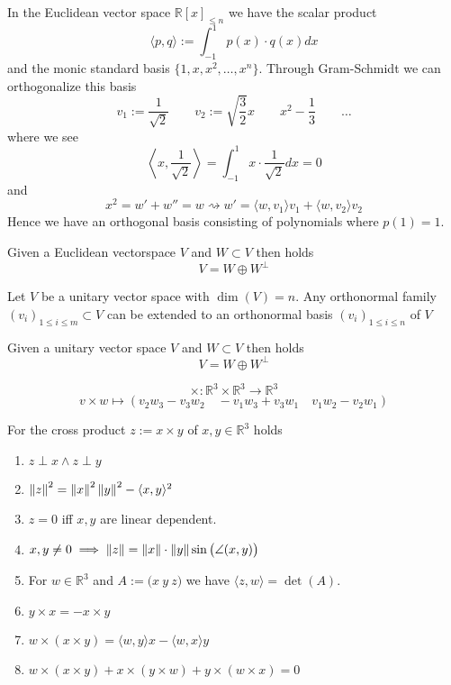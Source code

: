 \begin{example}
   In the Euclidean vector space \(\mathbb{R}[x]_{\leq n}\) we have the scalar product
   \[\langle p, q\rangle := \int_{-1}^1 p(x) \cdot q(x) dx\]
   and the monic standard basis \(\{1, x, x^2, \ldots, x^n\}\).
   Through Gram-Schmidt we can orthogonalize this basis
   \[v_1 := \frac{1}{\sqrt{2}} \qquad v_2 := \sqrt{\frac{3}{2}}x \qquad x^2 - \frac{1}{3} \qquad \ldots\]
   where we see
   \[\left\langle x, \frac{1}{\sqrt{2}}\right\rangle = \int_{-1}^1 x \cdot \frac{1}{\sqrt{2}} dx = 0\]
   and
   \[x^2 = w' + w'' = w \rightsquigarrow w' = \langle w, v_1 \rangle v_1 + \langle w, v_2\rangle v_2\]
   Hence we have an orthogonal basis consisting of polynomials where \(p(1) = 1\).
\end{example}

\begin{corollary}\label{cor:gram-schmidt}
   Given a Euclidean vectorspace \(V\) and \(W \subset V\) then holds
   \[V = W \oplus W^\perp\]
\end{corollary}

\begin{proposition}
   Let \(V\) be a unitary vector space with \(\dim(V) = n\). Any orthonormal family \((v_i)_{1\leq i \leq m} \subset V\)  can be extended to an orthonormal basis \((v_i)_{1 \leq i \leq n}\) of \(V\)
\end{proposition}
\begin{corollary}
   Given a unitary vector space \(V\) and \(W \subset V\) then holds
   \[V = W \oplus W^\perp\]
\end{corollary}

\begin{definition}
   \[\times: \mathbb{R}^3 \times \mathbb{R}^3 \to \mathbb{R}^3\]
   \[v \times w \mapsto (v_2w_3 - v_3w_2 \quad -v_1w_3 + v_3w_1 \quad v_1w_2 - v_2w_1)\]
\end{definition}

\begin{proposition}
   For the cross product \(z := x \times y\) of \(x, y \in \mathbb{R}^3\) holds
   \begin{enumerate}[label=\roman*, align=Center]
      \item \(z \perp x \land z \perp y\)
      \item \(\left\lVert z\right\rVert^2 = \left\lVert x\right\rVert^2\left\lVert y\right\rVert^2 - \langle x, y \rangle^2\)
      \item \(z = 0\) iff \(x, y\) are linear dependent.
      \item \(x, y \neq 0 \implies \left\lVert z\right\rVert = \left\lVert x\right\rVert\cdot\left\lVert y\right\rVert \sin\big(\angle(x, y)\big)\)
      \item For \(w \in \mathbb{R}^3\) and \(A := \big(x~y~z\big)\) we have \(\langle z, w\rangle = \det(A)\).
      \item \(y \times x = -x \times y\)
      \item \(w \times (x \times y) = \langle w, y\rangle x- \langle w, x \rangle y\)
      \item \(w \times (x \times y) + x \times (y \times w) + y \times (w \times x) = 0\)
   \end{enumerate}
\end{proposition}

